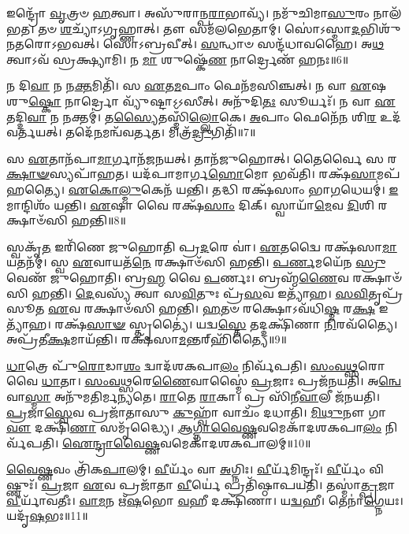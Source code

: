 𑌇𑌨𑍍𑌦𑍍𑌰𑍋᳴ \ul{𑌵𑍃}\-𑌤𑍍𑌰𑍞 \ul{𑌹}\-𑌤𑍍𑌵𑌾।
𑌅𑌸𑍁᳴𑌰𑌾𑌨𑍍𑌪\-\ul{𑌰𑌾}\-𑌭𑌾𑌵𑍍𑌯᳴।
𑌨𑌮𑍁᳴𑌚𑌿𑌮𑌾\-\ul{𑌸𑍁}\-𑌰𑌂 𑌨𑌾𑌲᳴𑌭𑌤।
𑌤𑍞 \ul{𑌶}\-𑌚𑍍𑌯𑌾᳴\-𑌽𑌗𑍃𑌹𑍍𑌣𑌾𑌤𑍍।
𑌤𑍗 𑌸𑌮᳴𑌲𑌭𑍇𑌤𑌾𑌮𑍍।
𑌸𑍋॑𑌽𑌸𑍍𑌮𑌾\-\ul{𑌦}\-𑌭𑌿𑌶𑍁᳴𑌨𑌤𑌰𑍋\-𑌽𑌭𑌵𑌤𑍍।
𑌸𑍋॑𑌽𑌬𑍍𑌰𑌵𑍀𑌤𑍍।
\-\ul{𑌸}\-𑌨𑍍𑌧𑌾𑍞 𑌸𑌨𑍍𑌦᳴𑌧𑌾𑌵𑌹𑍈।
𑌅\-\ul{𑌥} 𑌤𑍍𑌵𑌾𑌽𑌵᳴ 𑌸𑍍𑌰𑌕𑍍𑌷𑍍𑌯𑌾𑌮𑌿।
𑌨 \ul{𑌮𑌾} 𑌶𑍁𑌷𑍍𑌕𑍇᳴\-\ul{𑌣} 𑌨𑌾𑌰𑍍𑌦𑍍𑌰𑍇𑌣᳴ 𑌹𑌨𑌃॥6॥

𑌨 𑌦𑌿\-\ul{𑌵𑌾} 𑌨 𑌨\-\ul{𑌕𑍍𑌤}\-𑌮𑌿𑌤𑌿᳴।
𑌸 \ul{𑌏}\-𑌤\-\ul{𑌮}\-𑌪𑌾𑌂 𑌫𑍇𑌨᳴𑌮𑌸𑌿𑌞𑍍𑌚𑌤𑍍।
𑌨 𑌵𑌾 \ul{𑌏}\-𑌷 𑌶𑍁\-\ul{𑌷𑍍𑌕𑍋} 𑌨𑌾𑌰𑍍𑌦𑍍𑌰𑍋 𑌵𑍍𑌯𑍁᳴𑌷𑍍𑌟𑌾\-𑌽𑌽𑌸𑍀𑌤𑍍।
𑌅𑌨𑍁᳴𑌦𑌿\-\ul{𑌤𑌃} 𑌸𑍂𑌰𑍍𑌯𑌃᳴।
𑌨 𑌵𑌾 \ul{𑌏}\-𑌤𑌦𑍍𑌦𑌿\-\ul{𑌵𑌾} 𑌨 𑌨𑌕𑍍𑌤𑌮𑍍॑।
𑌤\-\ul{𑌸𑍍𑌯𑍈}\-𑌤𑌸𑍍𑌮𑌿𑌁᳴\-\ul{𑌲𑍍𑌲𑍋}\-𑌕𑍇।
\-\ul{𑌅}\-𑌪𑌾𑌂 𑌫𑍇𑌨𑍇᳴\-\ul{𑌨} 𑌶𑌿\-\ul{𑌰} 𑌉𑌦᳴𑌵𑌰𑍍𑌤𑌯𑌤𑍍।
𑌤𑌦𑍇᳴\-\ul{𑌨}\-𑌮𑌨𑍍𑌵᳴𑌵𑌰𑍍𑌤𑌤।
𑌮𑌿𑌤𑍍𑌰᳴\-\ul{𑌦𑍍𑌰𑍁}\-𑌗𑌿𑌤𑌿᳴॥7॥

𑌸 \ul{𑌏}\-𑌤𑌾𑌨᳴𑌪𑌾\-\ul{𑌮𑌾}\-𑌰𑍍𑌗𑌾𑌨᳴𑌜𑌨𑌯𑌤𑍍।
𑌤𑌾𑌨᳴𑌜𑍁𑌹𑍋𑌤𑍍।
𑌤𑍈𑌰𑍍𑌵𑍈 𑌸 𑌰\-\ul{𑌕𑍍𑌷𑌾}\-\-\ul{𑍟}\-𑌸𑍍𑌯𑌪𑌾᳴𑌹𑌤।
𑌯𑌦᳴𑌪𑌾𑌮𑌾𑌰𑍍𑌗\-\ul{𑌹𑍋}\-𑌮𑍋 𑌭𑌵᳴𑌤𑌿।
𑌰𑌕𑍍𑌷᳴\-\ul{𑌸𑌾}\-𑌮𑌪᳴𑌹𑌤𑍍𑌯𑍈।
\-\ul{𑌏}\-\-\ul{𑌕𑍋}\-\-\ul{𑌲𑍍𑌮𑍁}\-𑌕𑍇𑌨᳴ 𑌯𑌨𑍍𑌤𑌿।
𑌤𑌦𑍍𑌧𑌿 𑌰𑌕𑍍𑌷᳴𑌸𑌾𑌂 𑌭𑌾\-\ul{𑌗}\-𑌧𑍇𑌯𑌮𑍍॑।
\-\ul{𑌇}\-𑌮𑌾𑌨𑍍𑌦𑌿𑌶𑌂᳴ 𑌯𑌨𑍍𑌤𑌿।
\-\ul{𑌏}\-𑌷𑌾 𑌵𑍈 𑌰𑌕𑍍𑌷᳴\-\ul{𑌸𑌾𑌂} 𑌦𑌿𑌕𑍍।
𑌸𑍍𑌵𑌾𑌯𑌾᳴\-\ul{𑌮𑍇}\-𑌵 \ul{𑌦𑌿}\-𑌶𑌿 𑌰𑌕𑍍𑌷𑌾𑍞᳴𑌸𑌿 𑌹𑌨𑍍𑌤𑌿॥8॥

𑌸𑍍𑌵𑌕𑍃᳴\-\ul{𑌤} 𑌇𑌰𑌿᳴𑌣𑍇 𑌜𑍁𑌹𑍋𑌤𑌿 𑌪𑍍𑌰\-\ul{𑌦}\-𑌰𑍇 𑌵𑌾॑।
\-\ul{𑌏}\-𑌤𑌦𑍍𑌵𑍈 𑌰𑌕𑍍𑌷᳴𑌸𑌾\-\ul{𑌮𑌾}\-𑌯𑌤𑌨᳴𑌮𑍍।
𑌸𑍍𑌵 \ul{𑌏}\-𑌵𑌾𑌯𑌤᳴\-\ul{𑌨𑍇} 𑌰𑌕𑍍𑌷𑌾𑍞᳴𑌸𑌿 𑌹𑌨𑍍𑌤𑌿।
\-\ul{𑌪}\-\-\ul{𑌰𑍍𑌣}\-𑌮𑌯𑍇᳴𑌨 \ul{𑌸𑍍𑌰𑍁}\-𑌵𑍇𑌣᳴ 𑌜𑍁𑌹𑍋𑌤𑌿।
𑌬𑍍𑌰\-\ul{𑌹𑍍𑌮} 𑌵𑍈 \ul{𑌪}\-𑌰𑍍𑌣𑌃।
𑌬𑍍𑌰𑌹𑍍𑌮᳴\-\ul{𑌣𑍈}\-𑌵 𑌰𑌕𑍍𑌷𑌾𑍞᳴𑌸𑌿 𑌹𑌨𑍍𑌤𑌿।
\-\ul{𑌦𑍇}\-𑌵𑌸𑍍𑌯᳴ 𑌤𑍍𑌵𑌾 𑌸\-\ul{𑌵𑌿}\-𑌤𑍁𑌃 𑌪𑍍𑌰᳴\-\ul{𑌸}\-𑌵 𑌇𑌤𑍍𑌯𑌾᳴𑌹।
\-\ul{𑌸}\-\-\ul{𑌵𑌿}\-𑌤𑍃𑌪𑍍𑌰᳴𑌸𑍂𑌤 \ul{𑌏}\-𑌵 𑌰𑌕𑍍𑌷𑌾𑍞᳴𑌸𑌿 𑌹𑌨𑍍𑌤𑌿।
\-\ul{𑌹}\-𑌤𑍞 𑌰𑌕𑍍𑌷𑍋\-𑌽𑌵᳴𑌧𑌿\-\ul{𑌷𑍍𑌮} 𑌰\-\ul{𑌕𑍍𑌷} 𑌇𑌤𑍍𑌯𑌾᳴𑌹।
𑌰𑌕𑍍𑌷᳴\-\ul{𑌸𑌾}\-\-\ul{𑍟} 𑌸𑍍𑌤𑍃𑌤𑍍𑌯𑍈॑।
𑌯𑌦𑍍𑌵\-\ul{𑌸𑍍𑌤𑍇} 𑌤𑌦𑍍𑌦𑌕𑍍𑌷𑌿᳴𑌣𑌾 \ul{𑌨𑌿}\-𑌰𑌵᳴𑌤𑍍𑌯𑍈।
𑌅𑌪𑍍𑌰᳴𑌤𑍀\-\ul{𑌕𑍍𑌷}\-𑌮𑌾𑌯᳴𑌨𑍍𑌤𑌿।
𑌰𑌕𑍍𑌷᳴𑌸𑌾\-\ul{𑌮}\-𑌨𑍍𑌤𑌰𑍍‌\mbox{}𑌹𑌿᳴𑌤𑍍𑌯𑍈॥9॥\anuvakamend[\-\ul{𑌯}\-\-\ul{𑌚𑍍𑌛}\-\-\ul{𑌤𑌿} 𑌵𑌰𑍁᳴\-\ul{𑌣𑌂} 𑌤𑍃𑌤𑍀᳴\-\ul{𑌯𑌂} 𑌵𑌿𑌜𑌿᳴𑌤𑍍𑌯𑌾 𑌅\-𑌸𑍃𑌜\-\ul{𑌤} 𑌸𑌮𑍃᳴𑌦𑍍𑌧𑍍𑌯𑍈 𑌹\-\ul{𑌨𑍋} 𑌮𑌿𑌤𑍍𑌰᳴\-\ul{𑌦𑍍𑌰𑍁}\-𑌗𑌿𑌤𑌿᳴ 𑌹\-\ul{𑌨𑍍𑌤𑌿} 𑌸𑍍𑌤𑍃\-\ul{𑌤𑍍𑌯𑍈} 𑌤𑍍𑌰𑍀𑌣𑌿᳴ 𑌚]

\-\ul{𑌧𑌾}\-𑌤𑍍𑌰𑍇 𑌪𑍁᳴\-\ul{𑌰𑍋}\-𑌡𑌾\-\ul{𑌶𑌂} 𑌦𑍍𑌵𑌾𑌦᳴𑌶𑌕𑌪𑌾\-\ul{𑌲𑌂} 𑌨𑌿𑌰𑍍𑌵᳴𑌪𑌤𑌿।
\-\ul{𑌸𑌂}\-\-\ul{𑌵}\-\-\ul{𑌥𑍍𑌸}\-𑌰𑍋 𑌵𑍈 \ul{𑌧𑌾}\-𑌤𑌾।
\-\ul{𑌸𑌂}\-\-\ul{𑌵}\-\-\ul{𑌥𑍍𑌸}\-𑌰𑍇\-\ul{𑌣𑍈}\-𑌵𑌾𑌸𑍍𑌮𑍈॑ \ul{𑌪𑍍𑌰}\-𑌜𑌾𑌃 𑌪𑍍𑌰𑌜᳴𑌨𑌯𑌤𑌿।
𑌅\-\ul{𑌨𑍍𑌵𑍇}\-𑌵𑌾\-\ul{𑌸𑍍𑌮𑌾} 𑌅𑌨𑍁᳴𑌮𑌤𑌿𑌰𑍍𑌮𑌨𑍍𑌯𑌤𑍇।
\-\ul{𑌰𑌾}\-𑌤𑍇 \ul{𑌰𑌾}\-𑌕𑌾।
𑌪𑍍𑌰 𑌸𑌿᳴𑌨𑍀\-\ul{𑌵𑌾}\-𑌲𑍀 𑌜᳴𑌨𑌯𑌤𑌿।
\-\ul{𑌪𑍍𑌰}\-𑌜𑌾\-\ul{𑌸𑍍𑌵𑍇}\-𑌵 𑌪𑍍𑌰𑌜𑌾᳴𑌤𑌾𑌸𑍁 \ul{𑌕𑍁}\-𑌹𑍍𑌵𑌾᳴ 𑌵𑌾𑌚𑌂᳴ 𑌦𑌧𑌾𑌤𑌿।
\-\ul{𑌮𑌿}\-\-\ul{𑌥𑍁}\-𑌨𑍗 𑌗𑌾\-\ul{𑌵𑍗} 𑌦𑌕𑍍𑌷𑌿᳴\-\ul{𑌣𑌾} 𑌸𑌮𑍃᳴𑌦𑍍𑌧𑍍𑌯𑍈।
\-\ul{𑌆}\-\-\ul{𑌗𑍍𑌨𑌾}\-\-\ul{𑌵𑍈}\-\-\ul{𑌷𑍍𑌣}\-𑌵𑌮𑍇𑌕𑌾᳴\-𑌦𑌶\-𑌕𑌪𑌾\-\ul{𑌲𑌂} 𑌨𑌿𑌰𑍍𑌵᳴𑌪𑌤𑌿।
\-\ul{𑌐}\-\-\ul{𑌨𑍍𑌦𑍍𑌰𑌾}\-\-\ul{𑌵𑍈}\-\-\ul{𑌷𑍍𑌣}\-𑌵𑌮𑍇𑌕𑌾᳴\-𑌦𑌶\-𑌕𑌪𑌾𑌲𑌮𑍍॥10॥

\-\ul{𑌵𑍈}\-\-\ul{𑌷𑍍𑌣}\-𑌵𑌂 𑌤𑍍𑌰𑌿᳴𑌕\-\ul{𑌪𑌾}\-𑌲𑌮𑍍।
\-\ul{𑌵𑍀}\-𑌰𑍍𑌯𑌂᳴ 𑌵𑌾 \ul{𑌅}\-𑌗𑍍𑌨𑌿𑌃।
\-\ul{𑌵𑍀}\-𑌰𑍍𑌯᳴𑌮𑌿𑌨𑍍𑌦𑍍𑌰𑌃᳴।
\-\ul{𑌵𑍀}\-𑌰𑍍𑌯𑌂᳴ 𑌵𑌿𑌷𑍍𑌣𑍁𑌃᳴।
\-\ul{𑌪𑍍𑌰}\-𑌜𑌾 \ul{𑌏}\-𑌵 𑌪𑍍𑌰𑌜𑌾᳴𑌤𑌾 \ul{𑌵𑍀}\-𑌰𑍍𑌯𑍇॑ 𑌪𑍍𑌰𑌤𑌿᳴\-𑌷𑍍𑌠𑌾𑌪𑌯𑌤𑌿।
𑌤𑌸𑍍𑌮𑌾॑\-\ul{𑌤𑍍𑌪𑍍𑌰}\-𑌜𑌾 \ul{𑌵𑍀}\-𑌰𑍍𑌯𑌾᳴𑌵𑌤𑍀𑌃।
\-\ul{𑌵𑌾}\-\-\ul{𑌮}\-𑌨 𑌋᳴\-\ul{𑌷}\-𑌭𑍋 \ul{𑌵}\-𑌹𑍀 𑌦𑌕𑍍𑌷𑌿᳴𑌣𑌾।
𑌯\-\ul{𑌦𑍍𑌵}\-𑌹𑍀।
𑌤𑍇𑌨𑌾॑\-\ul{𑌗𑍍𑌨𑍇}\-𑌯𑌃।
𑌯𑌦𑍃᳴\-\ul{𑌷}\-𑌭𑌃॥11॥

